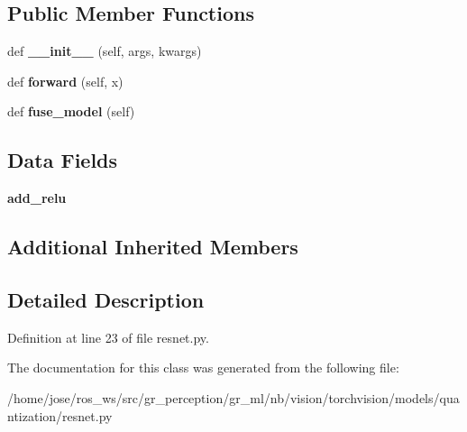 \subsection*{Public Member Functions}
\begin{DoxyCompactItemize}
\item 
\mbox{\label{classtorchvision_1_1models_1_1quantization_1_1resnet_1_1QuantizableBasicBlock_a117915cf7aab25fc2fd41b49a56ab5da}} 
def {\bfseries \+\_\+\+\_\+init\+\_\+\+\_\+} (self, args, kwargs)
\item 
\mbox{\label{classtorchvision_1_1models_1_1quantization_1_1resnet_1_1QuantizableBasicBlock_a86010aa75ec3560996003d850848b14b}} 
def {\bfseries forward} (self, x)
\item 
\mbox{\label{classtorchvision_1_1models_1_1quantization_1_1resnet_1_1QuantizableBasicBlock_ae4aa82836f4842fecf689ca564969453}} 
def {\bfseries fuse\+\_\+model} (self)
\end{DoxyCompactItemize}
\subsection*{Data Fields}
\begin{DoxyCompactItemize}
\item 
\mbox{\label{classtorchvision_1_1models_1_1quantization_1_1resnet_1_1QuantizableBasicBlock_aac183b16afecb07f7f665430cbe7ae62}} 
{\bfseries add\+\_\+relu}
\end{DoxyCompactItemize}
\subsection*{Additional Inherited Members}


\subsection{Detailed Description}


Definition at line 23 of file resnet.\+py.



The documentation for this class was generated from the following file\+:\begin{DoxyCompactItemize}
\item 
/home/jose/ros\+\_\+ws/src/gr\+\_\+perception/gr\+\_\+ml/nb/vision/torchvision/models/quantization/resnet.\+py\end{DoxyCompactItemize}
